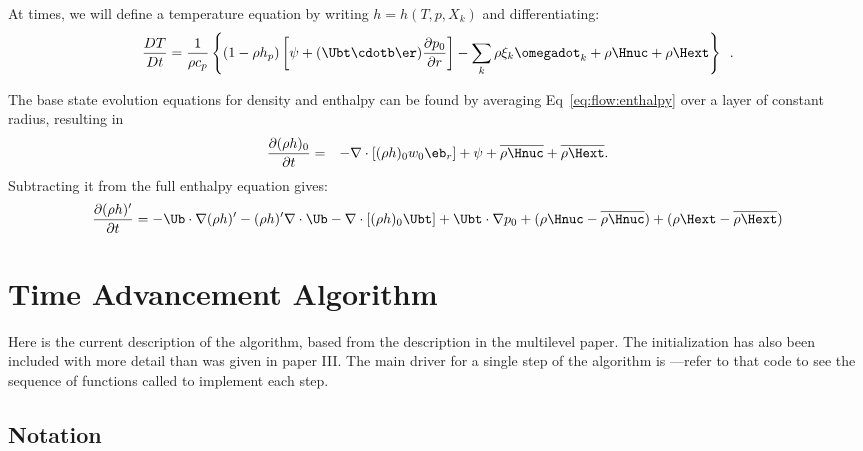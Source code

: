 At times, we will define a temperature equation by writing $h = h(T,p,X_k)$
and differentiating:
\begin{equation}
\label{eq:tempenthalpypsi}
\frac{DT}{Dt} = \frac{1}{\rho c_p} \left\{ \left(1 - \rho h_p\right) \left 
  [ \psi + (\Ubt \cdotb \er) \frac{\partial p_0}{\partial r} \right ]
 - \sum_k \rho \xi_k {\omegadot}_k
 + \rho \Hnuc + \rho \Hext \right \} \enskip  .
\end{equation}

The base state evolution equations for density and enthalpy can be
found by averaging Eq~\ref{eq:flow:enthalpy}
over a layer of constant radius, resulting in
\begin{eqnarray}
\frac{\partial(\rho h)_0}{\partial t} &=& -\nabla\cdot\left[(\rho h)_0w_0\eb_r\right] +
  \psi + \overline{\rho \Hnuc} + \overline{\rho \Hext}. \label{eq:flow:enthalpy_base}
\end{eqnarray}
Subtracting it from the full enthalpy equation gives:
\begin{equation}
\frac{\partial(\rho h)'}{\partial t} = -\Ub\cdot\nabla(\rho h)' - (\rho h)'\nabla\cdot\Ub - 
  \nabla\cdot\left[(\rho h)_0\Ubt\right] + \Ubt\cdot\nabla p_0 
   + ( \rho\Hnuc - \overline{\rho \Hnuc}) + (\rho\Hext - \overline{\rho \Hext}) 
\end{equation}




\section{Time Advancement Algorithm}\label{Sec:Time Advancement Algorithm}
Here is the current description of the algorithm, based from the
description in the multilevel paper.  The initialization has also been
included with more detail than was given in paper III.  The main
driver for a single step of the algorithm is ---refer
to that code to see the sequence of functions called to implement each
step.


\subsection{Notation}

